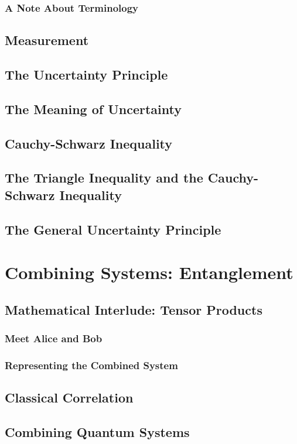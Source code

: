 \documentclass[a4paper]{article}
\begin{document}
\subsubsection{A Note About Terminology}
\subsection{Measurement}

\subsection{The Uncertainty Principle}
\subsection{The Meaning of Uncertainty}
\subsection{Cauchy-Schwarz Inequality}
\subsection{The Triangle Inequality and the Cauchy-Schwarz Inequality}
\subsection{The General Uncertainty Principle}

\section{Combining Systems: Entanglement}
\subsection{Mathematical Interlude: Tensor Products}
\subsubsection{Meet Alice and Bob}
\subsubsection{Representing the Combined System}
\subsection{Classical Correlation}

\subsection{Combining Quantum Systems}
\end{document}
